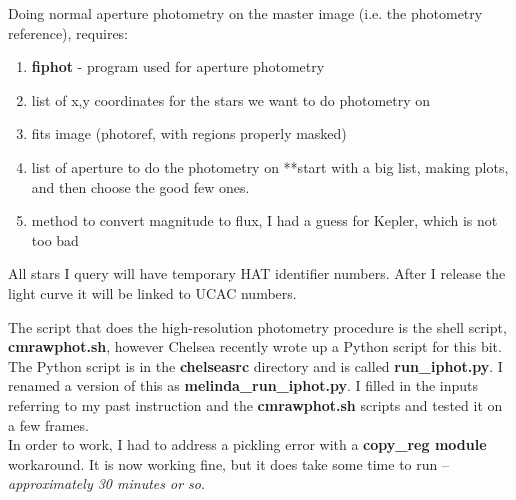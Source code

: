 \documentclass[11pt,letterpaper]{book} %
\begin{document}
Doing normal aperture photometry on the master image (i.e. the photometry reference), requires: 
\begin{enumerate}
\item \textbf{fiphot} - program used for aperture photometry
\item list of x,y coordinates for the stars we want to do photometry on 
\item fits image (photoref, with regions properly masked)
\item list of aperture to do the photometry on **start with a big list, making plots, and then choose the good few ones. 
\item method to convert magnitude to flux, I had a guess for Kepler, which is not too bad 
\end{enumerate}

All stars I query will have temporary HAT identifier numbers. 
After I release the light curve it will be linked to UCAC numbers.

The script that does the high-resolution photometry procedure is the shell script, \textbf{cmrawphot.sh}, however Chelsea recently wrote up a Python script for this bit.
The Python script is in the \textbf{chelseasrc} directory and is called \textbf{run\_iphot.py}. I renamed a version of this as \textbf{melinda\_run\_iphot.py}. I filled in the inputs referring to my past instruction and the \textbf{cmrawphot.sh} scripts and tested it on a few frames.\\ In order to work, I had to address a pickling error with a \textbf{copy\_reg module} workaround. It is now working fine, but it does take some time to run -- \textit{approximately 30 minutes or so}.
\end{document}
